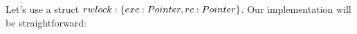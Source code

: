 \documentclass{article}
\begin{document}
\newcommand{\langassign}{\leftarrow}
\newcommand{\langloop}{\textbf{loop}}
\newcommand{\until}{\textbf{until}}
\newcommand{\langif}{\textbf{if}}
\newcommand{\langthen}{\textbf{then}}
\newcommand{\langelse}{\textbf{else}}
\newcommand{\langmatch}{\textbf{match}}
\newcommand{\langwith}{\textbf{with}}
\newcommand{\langend}{\textbf{end}}
\newcommand{\langlet}{\textbf{let}~}
\newcommand{\langref}{\textbf{ref}}
\newcommand{\langin}{\textbf{in}}

\newcommand{\CAS}{\textbf{CAS}}
\newcommand{\AtomicAdd}{\textbf{AtomicAdd}}

\newcommand{\Inv}{Inv}
\newcommand{\inv}{inv}
\newcommand{\HTInv}{HTInv}
\newcommand{\Heap}{Heap}
\newcommand{\htinv}{htinv}
\newcommand{\inlinehoare}[1]{{\color{blue}\left\{#1\right\}}}
\newcommand{\inlinehoarel}[1]{{\color{blue}\left\{#1\right.}}
\newcommand{\inlinehoarer}[1]{{\color{blue}\left.#1\right\}}}

Let's use a struct $rwlock : \{exc: Pointer, rc: Pointer\}$. Our implementation will be straightforward:
\end{document}
